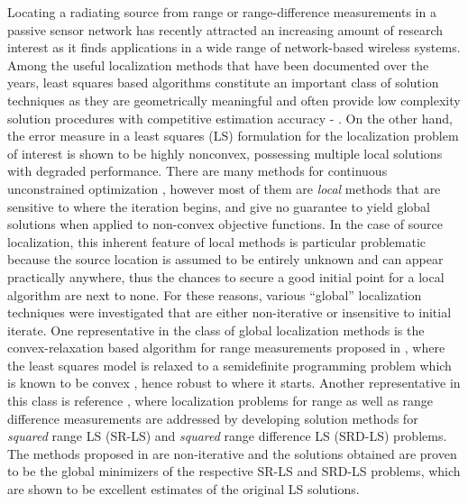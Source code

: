 \label{chapter:irw}

Locating a radiating source from range or range-difference measurements in a passive sensor network has recently attracted an increasing amount of research interest as it finds applications in a wide range of network-based wireless systems. Among the useful localization methods that have been documented over the years, least squares based algorithms constitute an important class of solution techniques as they are geometrically meaningful and often provide low complexity solution procedures with competitive estimation accuracy \cite{SmithAbel} - \cite{BeckStLi}. On the other hand, the error measure in a least squares (LS) formulation for the localization problem of interest is shown to be highly nonconvex, possessing multiple local solutions with degraded performance.  There are many methods for continuous unconstrained optimization \cite{AntonLu}, however most of them are \textit{local} methods that are
 sensitive to where the iteration begins, and give no guarantee to yield global solutions when applied to non-convex objective functions. In the case of source localization, this inherent feature of local methods is particular problematic because the source location is assumed to be entirely unknown and can appear practically anywhere, thus the chances to secure a good initial point for a local algorithm are next to none. For these reasons, various ``global'' localization techniques were investigated that are either non-iterative or insensitive to initial iterate. One representative in the class of global localization methods is the convex-relaxation based algorithm for range measurements proposed in \cite{Cheung}, where the least squares model is relaxed to a semidefinite programming problem which is known to be convex \cite{VBoyd}, hence robust to where it starts. Another representative in this class is reference \cite{BeckStLi}, where localization problems for  range as well as range difference measurements are addressed by developing solution methods for \textit{squared} range LS (SR-LS) and \textit{squared} range difference LS (SRD-LS) problems. The methods proposed in \cite{BeckStLi} are non-iterative and the solutions obtained are proven to be the global minimizers of the respective SR-LS and SRD-LS problems, which are shown to be excellent estimates of the original LS solutions.

